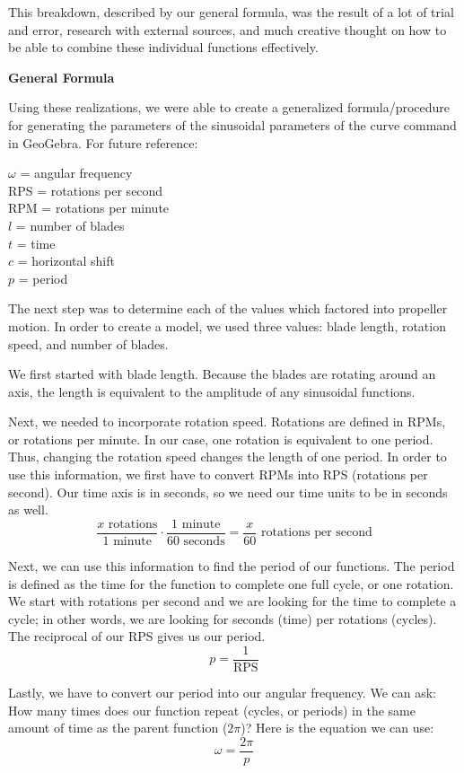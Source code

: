 This breakdown, described by our general formula, was the result of a lot of trial and error, research with external sources, and much creative thought on how to be able to combine these individual functions effectively.

\noindent
\textbf{General Formula}

Using these realizations, we were able to create a generalized formula/procedure for generating the parameters of the sinusoidal parameters of the curve command in GeoGebra.
For future reference:
\begin{center}
\(\omega\) = angular frequency\\
RPS = rotations per second\\
RPM = rotations per minute\\
\(l\) = number of blades\\
\(t\) = time\\
\(c\) = horizontal shift\\
\(p\) = period
\end{center}

The next step was to determine each of the values which factored into propeller motion. In order to create a model, we used three values: blade length, rotation speed, and number of blades.

We first started with blade length. Because the blades are rotating around an axis, the length is equivalent to the amplitude of any sinusoidal functions. 

Next, we needed to incorporate rotation speed. Rotations are defined in RPMs, or rotations per minute. In our case, one rotation is equivalent to one period. Thus, changing the rotation speed changes the length of one period. In order to use this information, we first have to convert RPMs into RPS (rotations per second). Our time axis is in seconds, so we need our time units to be in seconds as well. 
\[\frac{x\mbox{ rotations}}{1\mbox{ minute}}\cdot\frac{1\mbox{ minute}}{60\mbox{ seconds}}=\frac{x}{60}\mbox{ rotations per second}\]

Next, we can use this information to find the period of our functions. The period is defined as the time for the function to complete one full cycle, or one rotation. We start with rotations per second and we are looking for the time to complete a cycle; in other words, we are looking for seconds (time) per rotations (cycles). The reciprocal of our RPS gives us our period.
\[p=\frac{1}{\mbox{RPS}}\]

Lastly, we have to convert our period into our angular frequency. We can ask: How many times does our function repeat (cycles, or periods) in the same amount of time as the parent function (\(2\pi\))? Here is the equation we can use:
\[\omega=\frac{2\pi}{p}\]

